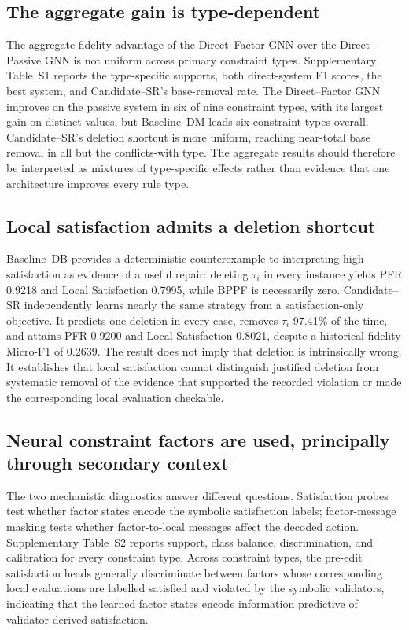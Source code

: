 \documentclass[a4paper,UKenglish,cleveref,autoref,thm-restate]{tgdk-v2021}
\begin{document}
\subsection{The aggregate gain is type-dependent}
\label{subsec:type-results}

The aggregate fidelity advantage of the Direct--Factor GNN over the Direct--Passive GNN is not uniform across primary constraint types. Supplementary Table~S1 reports the type-specific supports, both direct-system F1 scores, the best system, and Candidate--SR's base-removal rate. The Direct--Factor GNN improves on the passive system in six of nine constraint types, with its largest gain on distinct-values, but Baseline--DM leads six constraint types overall. Candidate--SR's deletion shortcut is more uniform, reaching near-total base removal in all but the conflicts-with type. The aggregate results should therefore be interpreted as mixtures of type-specific effects rather than evidence that one architecture improves every rule type.

\subsection{Local satisfaction admits a deletion shortcut}
\label{subsec:evidence-results}

Baseline--DB provides a deterministic counterexample to interpreting high satisfaction as evidence of a useful repair: deleting \(\tau_i\) in every instance yields PFR 0.9218 and Local Satisfaction 0.7995, while BPPF is necessarily zero. Candidate--SR independently learns nearly the same strategy from a satisfaction-only objective. It predicts one deletion in every case, removes \(\tau_i\) 97.41\% of the time, and attains PFR 0.9200 and Local Satisfaction 0.8021, despite a historical-fidelity Micro-F1 of 0.2639. The result does not imply that deletion is intrinsically wrong. It establishes that local satisfaction cannot distinguish justified deletion from systematic removal of the evidence that supported the recorded violation or made the corresponding local evaluation checkable.

\subsection{Neural constraint factors are used, principally through secondary context}
\label{subsec:h2-results}

The two mechanistic diagnostics answer different questions. Satisfaction probes test whether factor states encode the symbolic satisfaction labels; factor-message masking tests whether factor-to-local messages affect the decoded action. Supplementary Table~S2 reports support, class balance, discrimination, and calibration for every constraint type. Across constraint types, the pre-edit satisfaction heads generally discriminate between factors whose corresponding local evaluations are labelled satisfied and violated by the symbolic validators, indicating that the learned factor states encode information predictive of validator-derived satisfaction. 
\end{document}
